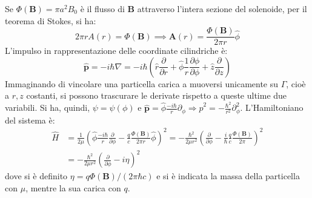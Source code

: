 \documentclass[11pt, a4paper]{scrartcl} %
\numberwithin{equation}{subsection}
\theoremstyle{style2}
\theoremstyle{style1}
\begin{document}
Se $\Phi(\mathbf{B} ) = \pi a^2 B_0$ \`e il flusso di $\mathbf{B} $ attraverso l'intera sezione del solenoide, per il teorema di Stokes, si ha:
\[
2 \pi r A(r) = \Phi (\mathbf{B} ) \implies \mathbf{A} (r) = \frac{\Phi(\mathbf{B}) }{2\pi r} \hat{\phi }
\] 
L'impulso in rappresentazione delle coordinate cilindriche \`e:
\[
	\hat{\mathbf{p} } = - i\hbar  \nabla  = - i\hbar  \left( \hat{r} \frac{\partial }{\partial r}  + \hat{\phi }\frac{1}{r}\frac{\partial \phi }{\partial \phi } + \hat{z}\frac{\partial }{\partial z} \right) 
\] 
Immaginando di vincolare una particella carica a muoversi unicamente su $\Gamma$, cio\`e a $r,z$ costanti, si possono trascurare le derivate rispetto a queste ultime due variabili. 
Si ha, quindi, $\psi = \psi (\phi )$ e $\hat{\mathbf{p} }= \hat{\phi }\frac{-i \hbar }{r}\partial _\phi \Rightarrow \hat{p}^2 = - \frac{\hbar ^2}{r^2} \partial _\phi ^2$.
L'Hamiltoniano del sistema \`e:
\begin{equation}
	\begin{split}
		\hat{H}&= \frac{1}{2\mu }\left(\hat{\phi }\frac{-i\hbar }{r} \frac{\partial }{\partial \phi } - \frac{q}{c} \frac{\Phi(\mathbf{B} )}{2\pi r} \hat{\phi }\right) ^2=- \frac{\hbar ^2}{2\mu  r^2}\left(\frac{\partial }{\partial \phi } - \frac{i}{\hbar }\frac{q}{c} \frac{\Phi(\mathbf{B} )}{2\pi}\right) ^2\\
		       &=- \frac{\hbar ^2}{2\mu r^2}\left(\frac{\partial }{\partial \phi } - i \eta\right) ^2
	\end{split}
\end{equation}
dove si \`e definito $\eta = q \Phi(\mathbf{B} ) / (2\pi \hbar  c)$ e si \`e indicata la massa della particella con $\mu $, mentre la sua carica con $q$.
\end{document}
